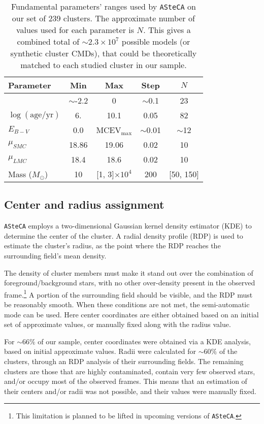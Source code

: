 \documentclass[referee]{aa}
\begin{document}
\begin{table}
\centering
\caption{Fundamental parameters' ranges used by \texttt{ASteCA} on our set
of 239 clusters. The approximate number of values used for each parameter is
$N$. This gives a combined total of ${\sim}2.3 {\times}10^7$ possible models 
(or synthetic cluster CMDs), that could be theoretically matched to each studied
cluster in our sample.}
\label{tab:ga-range}
\begin{tabular}{lcccc}
\hline\hline
 Parameter & Min & Max & Step & $N$\\
\hline
[Fe/H] & $\sim$-2.2 & 0 & $\sim$0.1 & 23\\
$\log\mathrm{(age/yr)}$ & 6. & 10.1 & 0.05 & 82\\
$E_{B-V}$ & 0.0 & MCEV$_{\max}$ & ${\sim}$0.01 & $\sim$12\\
$\mu_{SMC}$ & 18.86 & 19.06 & 0.02 & 10\\
$\mu_{LMC}$ & 18.4 & 18.6 & 0.02 & 10\\
Mass ($M_{\odot}$) & 10 & [1, 3]${\times}10^{4}$ & 200 & [50, 150]\\
\hline
\end{tabular}
\end{table}



\subsection{Center and radius assignment}
\label{ssec:centre-radius}

\texttt{ASteCA} employs a two-dimensional Gaussian kernel density estimator 
(KDE) to determine the center of the cluster. A radial density profile (RDP) is
used to estimate the cluster's radius, as the point where the RDP reaches the
surrounding field's mean density.

The density of cluster members must make it stand out over the combination of
foreground/background stars, with no other over-density present in the observed
frame.\footnote{This limitation is planned to be lifted in upcoming versions of
\texttt{ASteCA}.} A portion of the surrounding field should be visible, and the
RDP must be reasonably smooth.
%
When these conditions are not met, the semi-automatic mode can be used. Here
center coordinates are either obtained based on an initial set of approximate
values, or manually fixed along with the radius value.

For ${\sim}66\%$ of our sample, center coordinates were obtained via a KDE
analysis, based on initial approximate values. Radii were calculated for
${\sim}60\%$ of the clusters, through an RDP analysis of their surrounding
fields.
%
The remaining clusters are those that are highly contaminated, contain very few
observed stars, and/or occupy most of the observed frames. This means that an
estimation of their centers and/or radii was not possible, and their values
were manually fixed.
\end{document}

